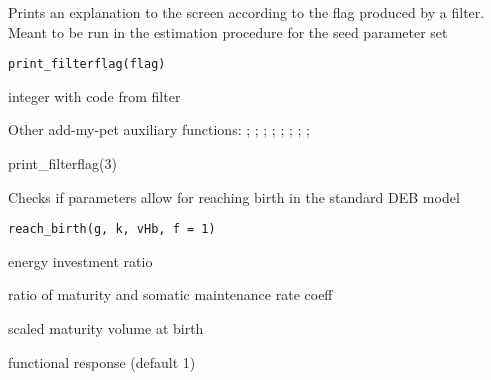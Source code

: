 \documentclass[a4paper]{book}
\begin{document}
%
\begin{Description}\relax
Prints an explanation to the screen according to the flag produced by a filter.
Meant to be run in the estimation procedure for the seed parameter set
\end{Description}
%
\begin{Usage}
\begin{verbatim}
print_filterflag(flag)
\end{verbatim}
\end{Usage}
%
\begin{Arguments}
\begin{ldescription}
\item[\code{flag}] integer with code from filter
\end{ldescription}
\end{Arguments}
%
\begin{SeeAlso}\relax
Other add-my-pet auxiliary functions: ;
; ;
; ;
; ;
; 
\end{SeeAlso}
%
\begin{Examples}
\begin{ExampleCode}
print_filterflag(3)
\end{ExampleCode}
\end{Examples}
%
\begin{Description}\relax
Checks if parameters allow for reaching birth in the standard DEB model
\end{Description}
%
\begin{Usage}
\begin{verbatim}
reach_birth(g, k, vHb, f = 1)
\end{verbatim}
\end{Usage}
%
\begin{Arguments}
\begin{ldescription}
\item[\code{g}] energy investment ratio

\item[\code{k}] ratio of maturity and somatic maintenance rate coeff

\item[\code{vHb}] scaled maturity volume at birth

\item[\code{f}] functional response (default 1)
\end{ldescription}
\end{Arguments}
\end{document}
